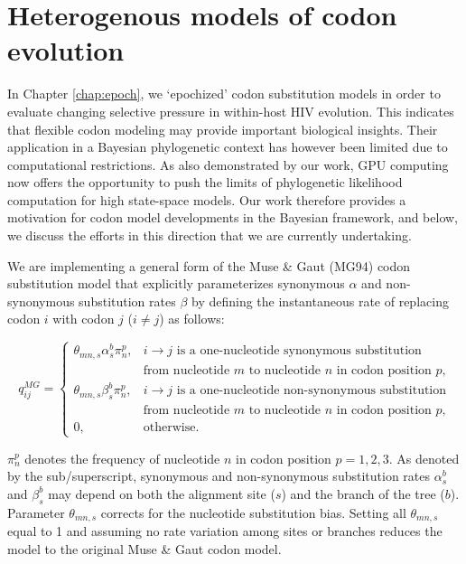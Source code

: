 \section{Heterogenous models of codon evolution\label{sub:dpp}}


In Chapter \ref{chap:epoch}, we `epochized' codon substitution models in order to evaluate changing selective pressure in within-host HIV evolution. 
This indicates that flexible codon modeling may provide important biological insights. 
Their application in a Bayesian phylogenetic context has however been limited due to computational restrictions. 
As also demonstrated by our work, GPU computing now offers the opportunity to push the limits of phylogenetic likelihood computation for high state-space models. 
Our work therefore provides a motivation for codon model developments in the Bayesian framework, and below, we discuss the efforts in this direction that we are currently undertaking.

We are implementing a general form of the Muse \& Gaut (MG94) codon substitution model \citep{Muse1994} that explicitly parameterizes synonymous $\alpha$ and non-synonymous substitution rates $\beta$ by defining the instantaneous rate of replacing codon $i$ with codon $j$ ($i \neq j$) as follows:

\begin{displaymath}
q_{ij}^{MG} = \begin{cases} \theta_{mn,s}\alpha_{s}^{b}\pi_{n}^{p}, & i \to j \text{ is a one-nucleotide synonymous substitution} \\ & \text{from nucleotide $m$ to nucleotide $n$ in codon position $p$,} \\ \theta_{mn,s}\beta_{s}^{b}\pi_{n}^{p}, & i \to j \text{ is a one-nucleotide non-synonymous substitution} \\ & \text{from nucleotide $m$ to nucleotide $n$ in codon position $p$,} \\ 0, & \text{otherwise.} \end{cases}
\end{displaymath}

$\pi_{n}^{p}$ denotes the frequency of nucleotide $n$ in codon position $p = 1,2,3$. 
As denoted by the sub/superscript, synonymous and non-synonymous substitution rates $\alpha_{s}^{b}$ and  $\beta_{s}^{b}$ may depend on both the alignment site ($s$) and the branch of the tree ($b$). 
Parameter $\theta_{mn,s}$ corrects for the nucleotide substitution bias. 
Setting all $\theta_{mn,s}$ equal to 1 and assuming no rate variation among sites or branches reduces the model to the original Muse \& Gaut codon model.%

